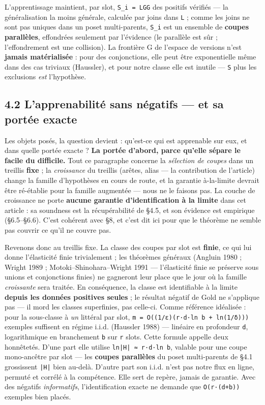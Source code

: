 \documentclass[11pt]{article}
\begin{document}
L'apprentissage maintient, par slot, \texttt{S\_i = LGG} des positifs vérifiés — la généralisation la moins générale, calculée par joins dans \texttt{L} ; comme les joins ne sont pas uniques dans un poset multi-parents, \texttt{S\_i} est un ensemble de \textbf{coupes parallèles}, effondrées seulement par l'évidence (le parallèle est sûr ; l'effondrement est une collision). La frontière G de l'espace de versions n'est \textbf{jamais matérialisée} : pour des conjonctions, elle peut être exponentielle même dans des cas triviaux (Haussler), et pour notre classe elle est inutile — \texttt{S} plus les exclusions \emph{est} l'hypothèse.

\subsection*{4.2 L'apprenabilité sans négatifs — et sa portée exacte}

Les objets posés, la question devient : qu'est-ce qui est apprenable sur eux, et dans quelle portée exacte ? \textbf{La portée d'abord, parce qu'elle sépare le facile du difficile.} Tout ce paragraphe concerne la \emph{sélection de coupes} dans un treillis \textbf{fixe} ; la \emph{croissance} du treillis (arêtes, alias — la contribution de l'article) change la famille d'hypothèses en cours de route, et la garantie à-la-limite devrait être ré-établie pour la famille augmentée — nous ne le faisons pas. La couche de croissance ne porte \textbf{aucune garantie d'identification à la limite} dans cet article : sa soundness est la récupérabilité de §4.5, et son évidence est empirique (§6.5–§6.6). C'est cohérent avec §8, et c'est dit ici pour que le théorème ne semble pas couvrir ce qu'il ne couvre pas.

Revenons donc au treillis fixe. La classe des coupes par slot est \textbf{finie}, ce qui lui donne l'élasticité finie trivialement ; les théorèmes généraux (Angluin 1980 ; Wright 1989 ; Motoki–Shinohara–Wright 1991 — l'élasticité finie se préserve sous unions et conjonctions finies) ne gagneront leur place que le jour où la famille \emph{croissante} sera traitée. En conséquence, la classe est identifiable à la limite \textbf{depuis les données positives seules} ; le résultat négatif de Gold ne s'applique pas — il mord les classes superfinies, pas celle-ci. Comme référence idéalisée : pour la sous-classe à \emph{un} littéral par slot, \texttt{m = O((1/ε)(r·d·ln b + ln(1/δ)))} exemples suffisent en régime i.i.d. (Haussler 1988) — linéaire en profondeur \texttt{d}, logarithmique en branchement \texttt{b} sur \texttt{r} slots. Cette formule appelle deux honnêtetés. D'une part elle utilise \texttt{ln|H| ≈ r·d·ln b}, valable pour une coupe mono-ancêtre par slot — les \textbf{coupes parallèles} du poset multi-parents de §4.1 grossissent \texttt{|H|} bien au-delà. D'autre part son i.i.d. n'est pas notre flux en ligne, permuté et corrélé à la compétence. Elle sert de repère, jamais de garantie. Avec des négatifs \emph{informatifs}, l'identification exacte ne demande que \texttt{O(r·(d+b))} exemples bien placés.
\end{document}
